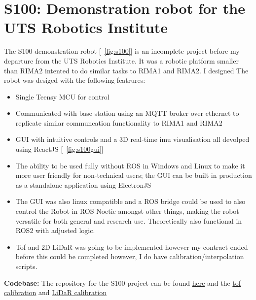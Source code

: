 \newpage
\section{S100: Demonstration robot for the UTS Robotics Institute} 
\label{sec:s100}
The S100 demonstration robot [~\ref{fig:s100}] is an incomplete project before my departure from the UTS Robotics Institute. It was a robotic platform smaller than RIMA2 intented to do similar tasks to RIMA1 and RIMA2. I designed The robot
was desiged with the following featrures:

\begin{itemize}
    \item Single Teensy MCU for control
    \item Communicated with base station using an MQTT broker over ethernet to replicate similar communcation functionality to RIMA1 and RIMA2
    \item GUI with intuitive controls and a 3D real-time imu visualisation all devolped using ReactJS [~\ref{fig:s100gui}]
    \item The ability to be used fully without ROS in Windows and Linux to make it more user friendly for non-technical users; the GUI can be built in production as a standalone application using ElectronJS
    \item The GUI was also linux compatible and a ROS bridge could be used to also control the Robot in ROS Noetic amongst other things, making the robot versatile for both general and research use. Theoretically also functional in ROS2 with adjusted logic.
    \item Tof and 2D LiDaR was going to be implemented however my contract ended before this could be completed however, I do have calibration/interpolation scripts.
\end{itemize}

\textbf{Codebase: } The repository for the S100 project can be found \href{https://github.com/jackfruittt/S100_Interface}{here} and the \href{https://github.com/jackfruittt/tmf8801_Calibration}{tof calibration}
and \href{https://github.com/jackfruittt/Hokuyo_Calibration}{LiDaR calibration}

\newpage
{}
